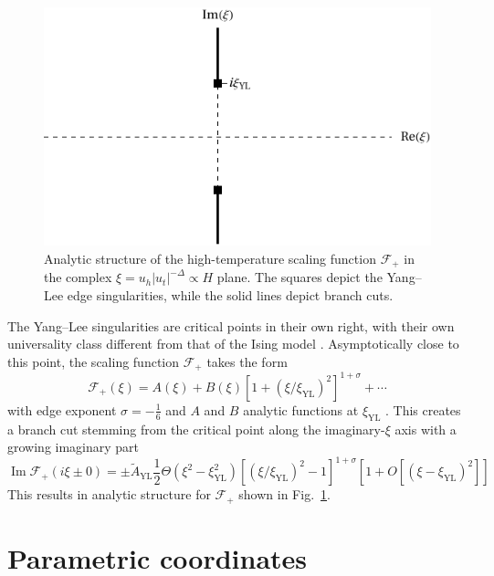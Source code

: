 \documentclass[
aps,
pre,
preprint,
longbibliography,
floatfix
]{revtex4-2}
\begin{document}
\begin{figure}
  \includegraphics{figs/F_higher_singularities.pdf}
  \caption{
    Analytic structure of the high-temperature scaling function $\mathcal F_+$
    in the complex $\xi=u_h|u_t|^{-\Delta}\propto H$ plane. The squares
    depict the Yang--Lee edge singularities, while the solid lines depict
    branch cuts.
  } \label{fig:higher.singularities}
\end{figure}

The Yang--Lee singularities are critical points in their own right, with their
own universality class different from that of the Ising model
\cite{Fisher_1978_Yang-Lee}. Asymptotically close to this point, the scaling
function $\mathcal F_+$ takes the form
\begin{equation} \label{eq:yang.lee.sing}
  \mathcal F_+(\xi)
  =A(\xi) +B(\xi)[1+(\xi/\xi_{\mathrm{YL}})^2]^{1+\sigma}+\cdots
\end{equation}
with edge exponent $\sigma=-\frac16$ and $A$ and $B$ analytic functions at
$\xi_\mathrm{YL}$ \cite{Cardy_1985_Conformal, Fonseca_2003_Ising}. This creates
a branch cut stemming from the critical point along the imaginary-$\xi$ axis
with a growing imaginary part
\begin{equation}
  \operatorname{Im}\mathcal F_+(i\xi\pm0)=\pm\tilde A_\mathrm{YL}\frac12\Theta(\xi^2-\xi_\mathrm{YL}^2)[(\xi/\xi_\mathrm{YL})^2-1]^{1+\sigma}[1+O[(\xi-\xi_\mathrm{YL})^2]]
\end{equation}
This results in analytic structure for $\mathcal F_+$ shown in
Fig.~\ref{fig:higher.singularities}.

\section{Parametric coordinates}
\end{document}
